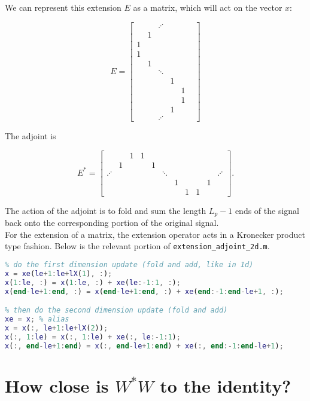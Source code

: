 \documentclass{article}
\theoremstyle{mystuff}
\theoremstyle{myexample}
\theoremstyle{named}
\begin{document}
\noindent We can represent this extension $E$ as a matrix, which will act on the vector $x$:

\[ E = \begin{bmatrix} & & \iddots & & &\\ & 1 &&&&\\ 1&&&&&\\1&&&&\\&1&&&&\\&&\ddots&&&\\&&&1&\\&&&&1\\&&&&1\\&&&1&\\&&\iddots&&\end{bmatrix} \] 

The adjoint is

\[ E^\ast = \begin{bmatrix}
            &&1&1&&&&&&&\\
            &1&&&1&&&&&&\\
            \iddots&&&&&\ddots&&&&&\iddots\\
            &&&&&&1&&&1&\\
            &&&&&&&1&1&&
            \end{bmatrix}. \] 

\noindent The action of the adjoint is to fold and sum the length $L_p-1$ ends of the signal back onto the corresponding portion of the original signal.\\

For the extension of a matrix, the extension operator acts in a Kronecker product type fashion.  Below is the relevant portion of \verb|extension_adjoint_2d.m|.

\begin{lstlisting}[language=matlab]
% this feels like a Kronecker product
% do the first dimension update (fold and add, like in 1d)
x = xe(le+1:le+lX(1), :);
x(1:le, :) = x(1:le, :) + xe(le:-1:1, :);
x(end-le+1:end, :) = x(end-le+1:end, :) + xe(end:-1:end-le+1, :);

% then do the second dimension update (fold and add)
xe = x; % alias
x = x(:, le+1:le+lX(2));
x(:, 1:le) = x(:, 1:le) + xe(:, le:-1:1);
x(:, end-le+1:end) = x(:, end-le+1:end) + xe(:, end:-1:end-le+1);
\end{lstlisting}





\section{How close is $W^\ast W$ to the identity?}



\cite{mallat_2009}
\cite{strang_1996}
\cite{beck_2009}
\cite{hansen_2006}



\end{document}

